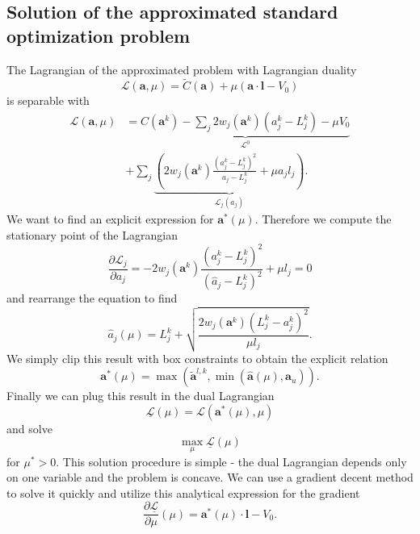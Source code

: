 \subsection{Solution of the approximated standard optimization problem}
\label{sec:sizing:solution}
The Lagrangian of the approximated problem with Lagrangian duality
\begin{equation}
    \mathcal{L}(\mathbf{a}, \mu) = \tilde{C}(\mathbf{a}) + \mu \left( \mathbf{a} \cdot \mathbf{l} - V_0 \right)
\end{equation}
is separable with 
\begin{equation}
    \begin{split}
        \mathcal{L}(\mathbf{a}, \mu) &= \underbrace{C(\mathbf{a}^k) - \sum_j 2w_j (\mathbf{a}^k) (a^k_j-L^k_j) - \mu V_0}_{\mathcal{L}^0} \\
        &+ \sum_j \underbrace{\left(2 w_j (\mathbf{a}^k)
        \frac{(a^k_j-L^k_j)^2}{a_j-L^k_j} + \mu a_j l_j \right)}_{\mathcal{L}_j (a_j)}.
    \end{split}
\end{equation}
We want to find an explicit expression for $\mathbf{a}^*(\mu)$. Therefore we compute the stationary point of the Lagrangian
\begin{equation}
    \frac{\partial \mathcal{L}_j}{\partial a_j} = -2 w_j (\mathbf{a}^k)
    \frac{(a^k_j-L^k_j)^2}{(\hat{a}_j-L^k_j)^2} + \mu l_j = 0
\end{equation}
and rearrange the equation to find 
\begin{equation}
    \hat{a}_j(\mu) = L_j^k + \sqrt{\frac{2 w_j (\mathbf{a}^k)
    (L^k_j-a^k_j)^2}{\mu l_j}}. 
\end{equation}
We simply clip this result with box constraints to obtain the explicit relation 
\begin{equation}
    \mathbf{a}^* (\mu) = \max\left(\tilde{\mathbf{a}}^{l,k}, \min \left(\hat{\mathbf{a}}(\mu), \mathbf{a}_u \right)\right). 
\end{equation}
Finally we can plug this result in the dual Lagrangian 
\begin{equation}
    \underline{\mathcal{L}}(\mu) = \mathcal{L}(\mathbf{a}^* (\mu), \mu)
\end{equation}
and solve 
\begin{equation}
    \max_{\mu} \underline{\mathcal{L}}(\mu)
\end{equation}
for $\mu^*>0$. This solution procedure is simple - the dual Lagrangian depends only on one variable and the problem is concave. We can use a gradient decent method to solve it quickly and utilize this analytical expression for the gradient 
\begin{equation}
    \frac{\partial \underline{\mathcal{L}}}{\partial \mu}(\mu) =  \mathbf{a}^* (\mu) \cdot \mathbf{l} - V_0.
\end{equation}


